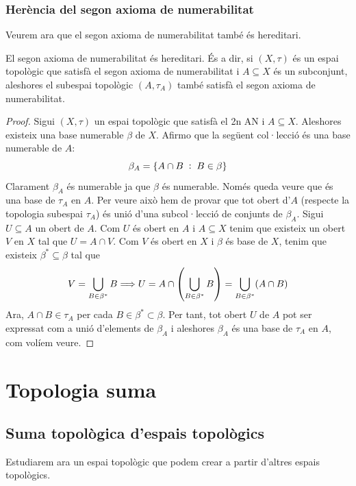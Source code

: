 \documentclass[../main.tex]{subfiles}
\begin{document}
\subsubsection{Herència del segon axioma de numerabilitat}
Veurem ara que el segon axioma de numerabilitat també és hereditari.

\begin{ter}
\label{ter:2anhereditari} El segon axioma de numerabilitat és hereditari. És a dir, si $(X,\tau)$ és un espai topològic que satisfà el segon axioma de numerabilitat i $A\subseteq X$ és un subconjunt, aleshores el subespai topològic $(A,\tau_A)$ també satisfà el segon axioma de numerabilitat.
\end{ter}
\begin{proof}
Sigui $(X,\tau)$ un espai topològic que satisfà el 2n AN i $A\subseteq X$. Aleshores existeix una base numerable $\beta$ de $X$. Afirmo que la següent col·lecció és una base numerable de $A$:
\begin{equation}
    \notag
    \beta_A = \{A\cap B\;:\;B\in\beta\}
\end{equation}
Clarament $\beta_A$ és numerable ja que $\beta$ és numerable. Només queda veure que és una base de $\tau_A$ en $A$. Per veure això hem de provar que tot obert d'$A$ (respecte la topologia subespai $\tau_A$) és unió d'una subcol·lecció de conjunts de $\beta_A$. Sigui $U\subseteq A$ un obert de $A$. Com $U$ és obert en $A$ i $A\subseteq X$ tenim que existeix un obert $V$ en $X$ tal que $U = A\cap V$. Com $V$ és obert en $X$ i $\beta$ és base de $X$, tenim que existeix $\beta^*\subseteq \beta$ tal que
\begin{equation}
    \notag
    V = \bigcup_{B\in\beta^*}B \Longrightarrow U =  A\cap \left(\bigcup_{B\in\beta^*}B\right) = \bigcup_{B\in\beta^*}(A\cap B)
\end{equation}
Ara, $A\cap B\in\tau_A$ per cada $B\in\beta^*\subset\beta$. Per tant, tot obert $U$ de $A$ pot ser expressat com a unió d'elements de $\beta_A$ i aleshores $\beta_A$ és una base de $\tau_A$ en $A$, com volíem veure.
\end{proof}

\section{Topologia suma}
\subsection{Suma topològica d'espais topològics}
Estudiarem ara un espai topològic que podem crear a partir d'altres espais topològics.
\end{document}
